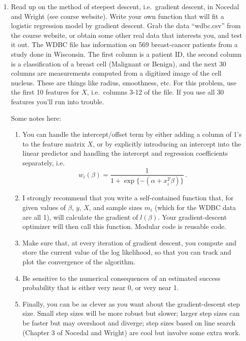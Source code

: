 \documentclass{article}
\begin{document}
\begin{enumerate}[label=(\Alph*)]
{}

\item Read up on the method of steepest descent, i.e.~gradient descent, in Nocedal and Wright (see course website).  Write your own function that will fit a logistic regression model by gradient descent.  Grab the data ``wdbc.csv'' from the course website, or obtain some other real data that interests you, and test it out.  The WDBC file has information on 569 breast-cancer patients from a study done in Wisconsin.  The first column is a patient ID, the second column is a classification of a breast cell (Malignant or Benign), and the next 30 columns are measurements computed from a digitized image of the cell nucleus.  These are things like radius, smoothness, etc.  For this problem, use the first 10 features for $X$, i.e.~columns 3-12 of the file.  If you use all 30 features you'll run into trouble.

Some notes here:
\begin{enumerate}
\item You can handle the intercept/offset term by either adding a column of 1's to the feature matrix $X$, or by explicitly introducing an intercept into the linear predictor and handling the intercept and regression coefficients separately, i.e.
$$
w_i(\beta) =  \frac{1}{1 + \exp\{-(\alpha + x_i^T \beta )\}} \, .
$$
\item I strongly recommend that you write a self-contained function that, for given values of $\beta$, $y$, $X$, and sample sizes $m_i$ (which for the WDBC data are all 1), will calculate the gradient of $l(\beta)$.  Your gradient-descent optimizer will then call this function.  Modular code is reusable code.
\item Make sure that, at every iteration of gradient descent, you compute and store the current value of the log likelihood, so that you can track and plot the convergence of the algorithm.
\item Be sensitive to the numerical consequences of an estimated success probability that is either very near 0, or very near 1.
\item Finally, you can be as clever as you want about the gradient-descent step size.  Small step sizes will be more robust but slower; larger step sizes can be faster but may overshoot and diverge; step sizes based on line search (Chapter 3 of Nocedal and Wright) are cool but involve some extra work.
\end{enumerate}



\end{enumerate}
\end{document}
